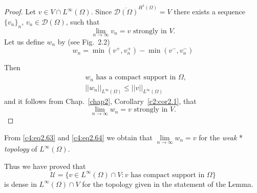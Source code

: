 \begin{proof}
Let $v \in V \cap L^\infty (\Omega)$. Since $\overline{\mathscr{D}(\Omega)}^{H^{1}(\Omega)} = V$ there exists a sequence $\{v_n\}_n$, $v_n \in \mathscr{D}(\Omega)$, such that 
\begin{equation}
\lim\limits_{n \to \infty} v_n = v \text{ strongly in } V. \tag{2.60}\label{c4:eq2.60}
\end{equation}
Let us define $w_n$ by (see Fig.~2.2)
\begin{equation}
w_n = \min (v^+, v^+_n) -\min (v^-,v^-_n) \tag{2.61}\label{c4:eq2.61}
\end{equation}

\begin{figure}[H]
\caption{}
\end{figure}

Then\pageoriginale  
\begin{align}
& w_n \text{ has a compact support in }\Omega, \tag{2.62}\label{c4:eq2.62}\\
& || w_n ||_{L^\infty(\Omega)} \leq ||v||_{L^\infty(\Omega)} \tag{2.63}\label{c4:eq2.63}
\end{align}
and it follows from Chap.~\ref{chap2}, Corollary~\ref{c2:cor2.1}, that 
\begin{equation}
\lim_{n \to \infty} w_n = v \text{ strongly in }V. \tag{2.64}\label{c4:eq2.64}
\end{equation}
\end{proof}

From \eqref{c4:eq2.63} and \eqref{c4:eq2.64} we obtain that $\lim\limits_{n \to \infty} w_n = v$ for the \textit{weak} * \textit{topology} of $L^\infty(\Omega)$.

Thus we have proved that 
$$
\mathscr{U}  = \{v \in L^\infty (\Omega) \cap V : v \text{ has compact support in }\Omega\}
$$
is dense in $L^\infty (\Omega) \cap V$ for the topology given in the statement of the Lemma. 

